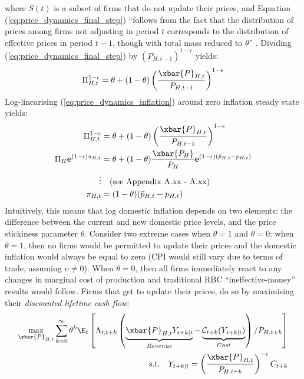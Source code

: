 where $S(t)$ is a subset of firms that do not update their prices, and Equation (\ref{eq:price_dynamics_final_step}) ``follows from the fact that the distribution of prices among firms not adjusting in period $t$ corresponds to the distribution of effective prices in period $t-1$, though with total mass reduced to $\theta$'' \parencite[84]{jordigal_2015_monetary}. Dividing (\ref{eq:price_dynamics_final_step}) by $(P_{H,t-1})^{1-\epsilon}$ yields:
\begin{equation}
    \Pi_{H,t}^{1-\epsilon} = \theta + (1-\theta)\left(\frac{\xbar{P}_{H,t}}{P_{H,t-1}}\right)^{1-\epsilon} \label{eq:price_dynamics_inflation}
\end{equation}
Log-linearising (\ref{eq:price_dynamics_inflation}) around zero inflation steady state yields:
\begin{align}
    \Pi_{H,t}^{1-\epsilon} &= \theta + (1-\theta)\left(\frac{\xbar{P}_{H,t}}{P_{H,t-1}}\right)^{1-\epsilon} \\
    \Pi_H \mathbf{e}^{(1-\epsilon)\pi_{H,t}} &= \theta + (1-\theta)\frac{\xbar{P_H}}{P_H}\mathbf{e}^{(1-\epsilon)(\bar{p}_{H,t} - p_{H,t})} \\
    \vdots & \quad \text{(see Appendix A.xx - A.xx)} \\
    \pi_{H,t} &= (1-\theta)(\bar{p}_{H,t} - p_{H,t})
\end{align}
Intuitively, this means that log domestic inflation depends on two elements: the difference between the current and new domestic price levels, and the price stickiness parameter $\theta$. Consider two extreme cases when $\theta = 1$ and $\theta = 0$: when $\theta = 1$, then no firms would be permitted to update their prices and the domestic inflation would always be equal to zero (CPI would still vary due to terms of trade, assuming $\upsilon \ne 0$). When $\theta = 0$, then all firms immediately react to any changes in marginal cost of production and traditional RBC ``ineffective-money'' results would follow. Firms that get to update their prices, do so by maximising their \textit{discounted lifetime cash flow}:
\begin{align}
    \max_{\xbar{P}_{H,t}} \sum_{k=0}^{\infty} \theta^k \E_t \left[\Lambda_{t,t+k} \left( \underbrace{\xbar{P}_{H,t} Y_{t+k|t}}_{Revenue} - \underbrace{\mathcal{C}_{t+k}(Y_{t+k|t})}_{Cost} \right) / P_{H,t+k} \right] \label{eq:profit_maximisation_cash_flow}\\
    \text{s.t.} \quad Y_{t+k|t} = \left(\frac{\xbar{P}_{H,t}}{P_{H,t+k}}\right)^{-\epsilon} C_{t+k} \label{eq:profit_maximisation_demand_constraints}
\end{align}
